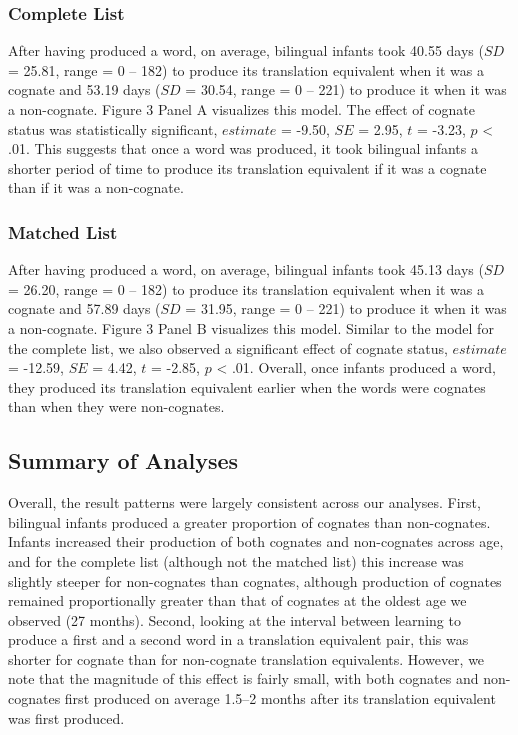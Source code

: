 \documentclass[
  ,man,floatsintext]{apa6}
\begin{document}
\hypertarget{complete-list-2}{%
\subsubsection{Complete List}\label{complete-list-2}}

After having produced a word, on average, bilingual infants took 40.55 days (\(SD\) = 25.81, range = 0 -- 182) to produce its translation equivalent when it was a cognate and 53.19 days (\(SD\) = 30.54, range = 0 -- 221) to produce it when it was a non-cognate. Figure 3 Panel A visualizes this model. The effect of cognate status was statistically significant, \(estimate\) = -9.50, \(SE\) = 2.95, \(t\) = -3.23, \(p\) \textless{} .01. This suggests that once a word was produced, it took bilingual infants a shorter period of time to produce its translation equivalent if it was a cognate than if it was a non-cognate.

\hypertarget{matched-list-2}{%
\subsubsection{Matched List}\label{matched-list-2}}

After having produced a word, on average, bilingual infants took 45.13 days (\(SD\) = 26.20, range = 0 -- 182) to produce its translation equivalent when it was a cognate and 57.89 days (\(SD\) = 31.95, range = 0 -- 221) to produce it when it was a non-cognate. Figure 3 Panel B visualizes this model. Similar to the model for the complete list, we also observed a significant effect of cognate status, \(estimate\) = -12.59, \(SE\) = 4.42, \(t\) = -2.85, \(p\) \textless{} .01. Overall, once infants produced a word, they produced its translation equivalent earlier when the words were cognates than when they were non-cognates.

\hypertarget{summary-of-analyses}{%
\subsection{Summary of Analyses}\label{summary-of-analyses}}

Overall, the result patterns were largely consistent across our analyses. First, bilingual infants produced a greater proportion of cognates than non-cognates. Infants increased their production of both cognates and non-cognates across age, and for the complete list (although not the matched list) this increase was slightly steeper for non-cognates than cognates, although production of cognates remained proportionally greater than that of cognates at the oldest age we observed (27 months). Second, looking at the interval between learning to produce a first and a second word in a translation equivalent pair, this was shorter for cognate than for non-cognate translation equivalents. However, we note that the magnitude of this effect is fairly small, with both cognates and non-cognates first produced on average 1.5--2 months after its translation equivalent was first produced.
\end{document}
